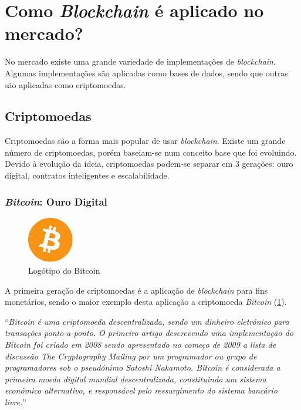 
\newpage
\section{Como \textit{Blockchain} é aplicado no mercado?}
\label{sec:blockchain_where}

No mercado existe uma grande variedade de implementações de \textit{blockchain}. Algumas implementações são aplicadas como bases de dados, sendo que outras são aplicadas como criptomoedas.

\subsection{Criptomoedas}

Criptomoedas são a forma mais popular de usar \textit{blockchain}. Existe um grande número de criptomoedas, porém baseiam-se num conceito base que foi evoluindo. Devido à evolução da ideia, criptomoedas podem-se separar em 3 gerações: ouro digital, contratos inteligentes e escalabilidade.

\subsubsection{\textit{Bitcoin}: Ouro Digital}

\begin{figure}
    \includegraphics[width=2cm]{images/bitcoin.png}
    \caption{Logótipo do Bitcoin}
    \label{fig:bitcoin-logo}
\end{figure}

A primeira geração de criptomoedas é a aplicação de \textit{blockchain} para fins monetários, sendo o maior exemplo desta aplicação a criptomoeda \textit{Bitcoin} (\cref{fig:bitcoin-logo}).

``\textit{Bitcoin é uma criptomoeda descentralizada, sendo um dinheiro eletrónico para transações ponto-a-ponto. O primeiro artigo descrevendo uma implementação do Bitcoin foi criado em 2008 sendo apresentado no começo de 2009 a lista de discussão \textit{The Cryptography Mailing} por um programador ou grupo de programadores sob o pseudónimo Satoshi Nakamoto. Bitcoin é considerada a primeira moeda digital mundial descentralizada, constituindo um sistema económico alternativo, e responsável pelo ressurgimento do sistema bancário livre.}'' \cite{bitcoin_wiki}

